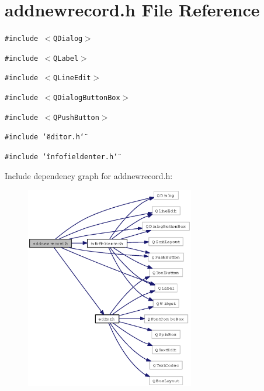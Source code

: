 \section{addnewrecord.h File Reference}
\label{addnewrecord_8h}
{\tt \#include $<$QDialog$>$}\par
{\tt \#include $<$QLabel$>$}\par
{\tt \#include $<$QLine\-Edit$>$}\par
{\tt \#include $<$QDialog\-Button\-Box$>$}\par
{\tt \#include $<$QPush\-Button$>$}\par
{\tt \#include \char`\"{}editor.h\char`\"{}}\par
{\tt \#include \char`\"{}infofieldenter.h\char`\"{}}\par


Include dependency graph for addnewrecord.h:\begin{figure}[H]
\begin{center}
\leavevmode
\includegraphics[width=209pt]{addnewrecord_8h__incl}
\end{center}
\end{figure}



